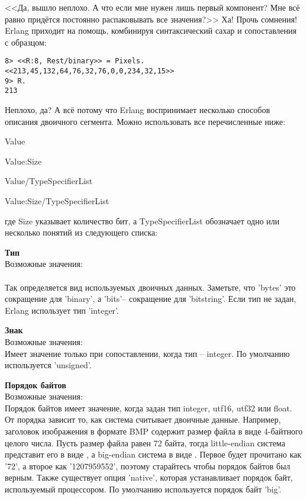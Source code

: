 <<Да, вышло неплохо.
А что если мне нужен лишь первый компонент?
Мне всё равно придётся постоянно распаковывать все значения?>>
Ха!
Прочь сомнения!
Erlang приходит на помощь, комбинируя синтаксический сахар и сопоставления с образцом:
\begin{lstlisting}[style=repl]
8> <<R:8, Rest/binary>> = Pixels.
<<213,45,132,64,76,32,76,0,0,234,32,15>>
9> R.
213
\end{lstlisting}

Неплохо, да?
А всё потому что Erlang воспринимает несколько способов описания двоичного сегмента.
Можно использовать все перечисленные ниже:

Value

Value:Size

Value/TypeSpecifierList

Value:Size/TypeSpecifierList

где Size указывает количество бит, а TypeSpecifierList обозначает одно или несколько понятий из следующего списка:

\begin{minipage}{\textwidth}
\textbf{Тип}\\ 
Возможные значения: \\ 
\\  
Так определяется вид используемых двоичных данных.
Заметьте, что 'bytes' это сокращение для 'binary', а 'bits'\--- сокращение для 'bitstring'.
Если тип не задан, Erlang использует тип 'integer'.\\ 
\end{minipage}

\begin{minipage}{\textwidth}
    \textbf{Знак}\\ 
    Возможные значения: \\ 
    Имеет значение только при сопоставлении, когда тип \--- integer.
    По умолчанию используется 'unsigned'.\\ 
\end{minipage}

\begin{minipage}{\textwidth}
    \textbf{Порядок байтов}\\ 
    Возможные значения: \\ 
    Порядок байтов имеет значение, когда задан тип integer, utf16, utf32 или float.
    От порядка зависит то, как система считывает двоичные данные.
    Например, заголовок изображения в формате BMP содержит размер файла в виде 4\--байтного целого числа.
    Пусть размер файла равен 72 байта, тогда little\--endian система представит его в виде , а big\--endian система в виде .
    Первое будет прочитано как '72', а второе как '1207959552', поэтому старайтесь чтобы порядок байтов был верным.
    Также существует опция 'native', которая устанавливает порядок байт, используемый процессором.
    По умолчанию используется порядок байт 'big'.\\ 
\end{minipage}

